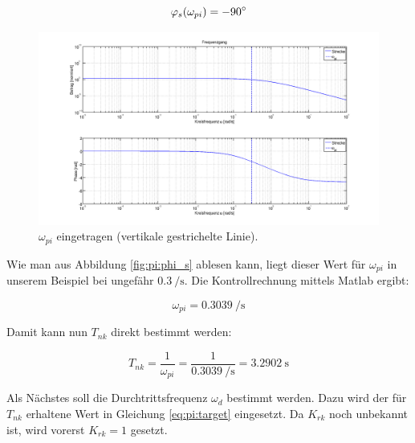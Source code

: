 \begin{equation} \label{eq:pi:phi_s}
    \varphi_s(\omega_{pi}) = -90 \degree
\end{equation}

\begin{figure}[h! width=\pagewidth]
    \includegraphics[width=.9\textwidth]{images/piStreckeOmegaPI.png}
    \caption{%
        $\omega_{pi}$ eingetragen (vertikale gestrichelte Linie).
    }
    \label{fig:pi:omega_pi}
\end{figure}

Wie man aus Abbildung \ref{fig:pi:phi_s} ablesen kann, liegt dieser Wert f\"ur
$\omega_{pi}$ in unserem  Beispiel bei ungef\"ahr $\SI{0.3}{\per\second}$. Die
Kontrollrechnung mittels Matlab ergibt:

\begin{equation} \label{eq:pi:omega_pi}
    \omega_{pi} = \SI{0.3039}{\per\second}
\end{equation}

Damit kann nun $T_{nk}$ direkt bestimmt werden\footnotemark[1]:

\begin{equation} \label{eq:pi:omega_pi}
    T_{nk} = \frac{1}{\omega_{pi}} = \frac{1}{\SI{0.3039}{\per\second}} = \SI{3.2902}{\second}
\end{equation}


Als N\"achstes  soll die Durchtrittsfrequenz $\omega_d$  bestimmt werden. Dazu
wird  der  f\"ur  $T_{nk}$  erhaltene  Wert  in  Gleichung  \ref{eq:pi:target}
eingesetzt. Da $K_{rk}$ noch unbekannt ist, wird vorerst $K_{rk} = 1$ gesetzt.

